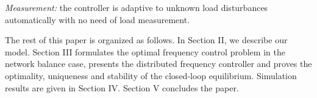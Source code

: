 \item \emph{Measurement:} the controller is adaptive to unknown load disturbances automatically with no need of load measurement. 
\eee

The rest of this paper is organized as follows. In Section II, we describe our model. Section III formulates the optimal frequency control problem in the network balance case, presents the distributed  frequency controller and proves  the optimality, uniqueness and stability of the closed-loop equilibrium. Simulation results are given in Section IV. Section V concludes the paper.




